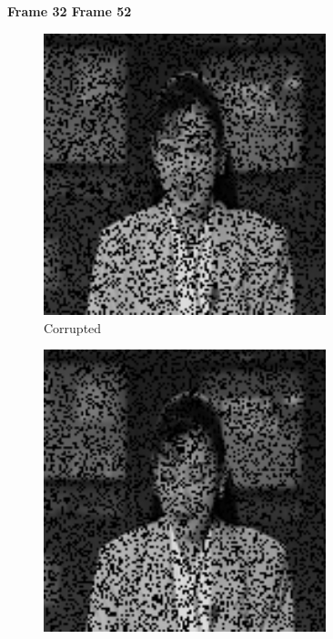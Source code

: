 \begin{figure}
  \centering
  \textbf{\hspace{0.2in} Frame 32 \hspace{1.5in} Frame 52\hspace{0.5in}\vspace{0.1in}}
  \begin{subfigure}{0.4\textwidth}
    \centering
    \includegraphics[width=0.9\textwidth]{Chapter7/Images/akiyo70_masked_32.png}
    \caption{Corrupted}
  \end{subfigure}
  \begin{subfigure}{0.4\textwidth}
    \centering
    \includegraphics[width=0.9\textwidth]{Chapter7/Images/akiyo70_masked_52.png}

\end{subfigure}
\end{figure}
